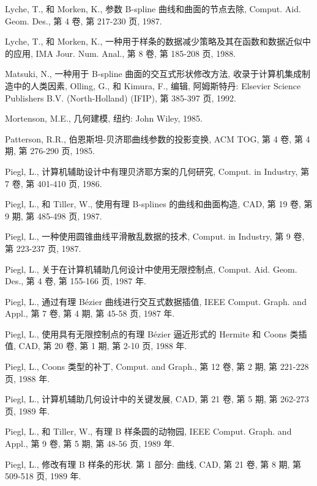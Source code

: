 \documentclass[../main.tex]{subfiles}
\begin{document}
\begin{BookBibliography}
 Lyche, T., 和 Morken, K., 参数 B-spline 曲线和曲面的节点去除, Comput. Aid. Geom. Des., 第 4 卷, 第 217-230 页, 1987.

 Lyche, T., 和 Morken, K., 一种用于样条的数据减少策略及其在函数和数据近似中的应用, IMA Jour. Num. Anal., 第 8 卷, 第 185-208 页, 1988.

 Matsuki, N., 一种用于 B-spline 曲面的交互式形状修改方法, 收录于计算机集成制造中的人类因素, Olling, G., 和 Kimura, F., 编辑, 阿姆斯特丹: Elsevier Science Publishers B.V. (North-Holland) (IFIP), 第 385-397 页, 1992.

 Mortenson, M.E., 几何建模, 纽约: John Wiley, 1985.

 Patterson, R.R., 伯恩斯坦-贝济耶曲线参数的投影变换, ACM TOG, 第 4 卷, 第 4 期, 第 276-290 页, 1985.

 Piegl, L., 计算机辅助设计中有理贝济耶方案的几何研究, Comput. in Industry, 第 7 卷, 第 401-410 页, 1986.

 Piegl, L., 和 Tiller, W., 使用有理 B-splines 的曲线和曲面构造, CAD, 第 19 卷, 第 9 期, 第 485-498 页, 1987.

 Piegl, L., 一种使用圆锥曲线平滑散乱数据的技术, Comput. in Industry, 第 9 卷, 第 223-237 页, 1987.

 Piegl, L., 关于在计算机辅助几何设计中使用无限控制点, Comput. Aid. Geom. Des., 第 4 卷, 第 155-166 页, 1987 年.

 Piegl, L., 通过有理 Bézier 曲线进行交互式数据插值, IEEE Comput. Graph. and Appl., 第 7 卷, 第 4 期, 第 45-58 页, 1987 年.

 Piegl, L., 使用具有无限控制点的有理 Bézier 逼近形式的 Hermite 和 Coons 类插值, CAD, 第 20 卷, 第 1 期, 第 2-10 页, 1988 年.

 Piegl, L., Coons 类型的补丁, Comput. and Graph., 第 12 卷, 第 2 期, 第 221-228 页, 1988 年.

 Piegl, L., 计算机辅助几何设计中的关键发展, CAD, 第 21 卷, 第 5 期, 第 262-273 页, 1989 年.

 Piegl, L., 和 Tiller, W., 有理 B 样条圆的动物园, IEEE Comput. Graph. and Appl., 第 9 卷, 第 5 期, 第 48-56 页, 1989 年.

 Piegl, L., 修改有理 B 样条的形状. 第 1 部分: 曲线, CAD, 第 21 卷, 第 8 期, 第 509-518 页, 1989 年.


\end{BookBibliography}
\end{document}
